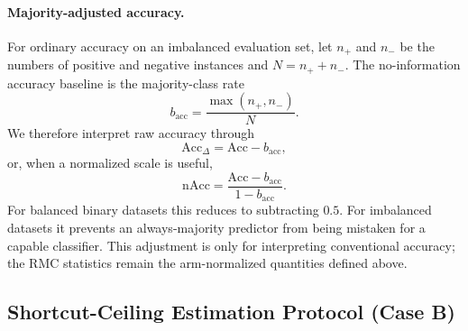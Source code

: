 \documentclass[conference]{IEEEtran}
\theoremstyle{remark}
\newcommand{\accBase}{b_{\mathrm{acc}}}
\newcommand{\AccDelta}{\mathrm{Acc}_{\Delta}}
\newcommand{\nAcc}{\mathrm{nAcc}}
\begin{document}
\paragraph{Majority-adjusted accuracy.}
For ordinary accuracy on an imbalanced evaluation set, let $n_{+}$ and $n_{-}$ be the numbers of positive and negative instances and $N=n_{+}+n_{-}$.  The no-information accuracy baseline is the majority-class rate
\begin{equation}\label{eq:acc-baseline-supp}
\accBase=\frac{\max(n_{+},n_{-})}{N}.
\end{equation}
We therefore interpret raw accuracy through
\begin{equation}\label{eq:acc-delta-supp}
\AccDelta=\mathrm{Acc}-\accBase,
\end{equation}
or, when a normalized scale is useful,
\begin{equation}\label{eq:nacc-supp}
\nAcc=\frac{\mathrm{Acc}-\accBase}{1-\accBase}.
\end{equation}
For balanced binary datasets this reduces to subtracting $0.5$.  For imbalanced datasets it prevents an always-majority predictor from being mistaken for a capable classifier.  This adjustment is only for interpreting conventional accuracy; the RMC statistics remain the arm-normalized quantities defined above.

\subsection{Shortcut-Ceiling Estimation Protocol (Case B)}
\label{sec:ceiling_estimation}
\end{document}

